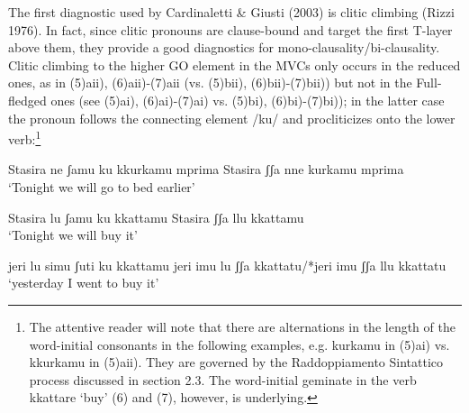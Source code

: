 \documentclass[output=paper,colorlinks,citecolor=brown,
]{langscibook}
\begin{document}
 The first diagnostic used by Cardinaletti \& Giusti (2003) is clitic climbing (Rizzi 1976). In fact, since clitic pronouns are clause-bound and target the first T-layer above them, they provide a good diagnostics for mono-clausality/bi-clausality. Clitic climbing to the higher GO element in the MVCs only occurs in the reduced ones, as in (5)aii), (6)aii)-(7)aii  (vs. (5)bii), (6)bii)-(7)bii)) but not in the Full-fledged ones (see (5)ai), (6)ai)-(7)ai) vs. (5)bi), (6)bi)-(7)bi)); in the latter case the pronoun follows the connecting element /ku/ and procliticizes onto the lower verb:\footnote{The attentive reader will note that there are alternations in the length of the word-initial consonants in the following examples, e.g. kurkamu in (5)ai) vs. kkurkamu in (5)aii).  They are governed by the Raddoppiamento Sintattico process discussed in section 2.3.  The word-initial geminate in the verb kkattare ‘buy’ (6) and (7), however, is underlying.} 

\ea
    \ea
        \z
    \ex
        \ea *Stasira ne ʃamu ku kkurkamu mprima
        \ex *Stasira ʃʃa nne kurkamu mprima\\
          `Tonight we will go to bed earlier'
          \z
    \z
\z

\ea
    \ea
        \z
    \ex
        \ea *Stasira lu ʃamu ku kkattamu
        \ex *Stasira ʃʃa  llu kkattamu\\
             `Tonight we will  buy it'
        \z
    \z
\z

\ea
    \ea
        \z
    \ex
        \ea *jeri lu simu  ʃuti  ku   kkattamu
        \ex *jeri imu lu ʃʃa  kkattatu/*jeri imu ʃʃa llu  kkattatu\\
        `yesterday I went to buy it'
        \z
    \z
\z
\end{document}
